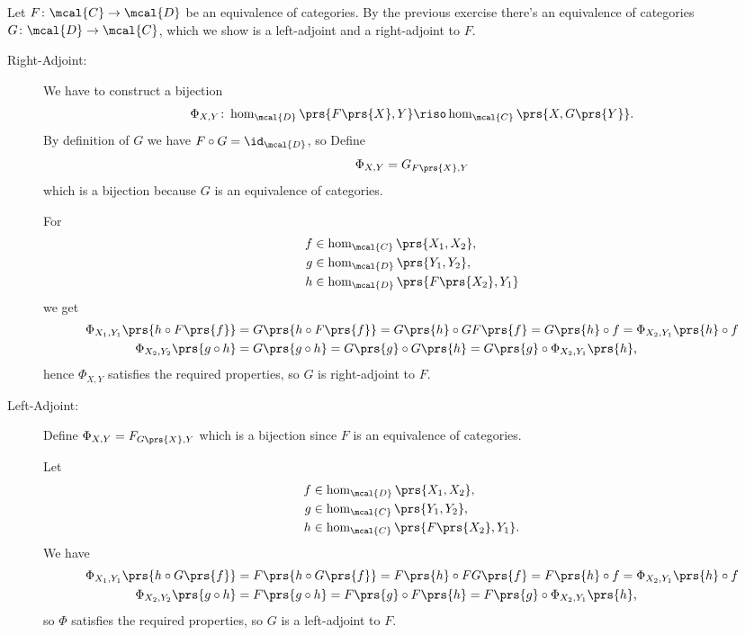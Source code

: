 \documentclass[10pt]{article}
\begin{document}
\begin{solution}%
Let $F \colon \mcal{C} \to \mcal{D}$ be an equivalence of categories. By the previous exercise there's an equivalence of categories $G \colon \mcal{D} \to \mcal{C}$, which we show is a left-adjoint and a right-adjoint to $F$.

\begin{description}
\item[Right-Adjoint:]
We have to construct a bijection 
\[\Phi_{X,Y} \colon \hom_{\mcal{D}}\prs{F\prs{X}, Y} \riso \hom_{\mcal{C}}\prs{X, G\prs{Y}} \text{.}\]
By definition of $G$ we have $F \circ G = \id_{\mcal{D}}$, so
Define
\[\Phi_{X,Y} = G_{F\prs{X}, Y}\]
which is a bijection because $G$ is an equivalence of categories.

For
\begin{align*}
f &\in \hom_{\mcal{C}}\prs{X_1, X_2},\\
g &\in \hom_{\mcal{D}}\prs{Y_1, Y_2},\\
h &\in \hom_{\mcal{D}}\prs{F\prs{X_2}, Y_1}
\end{align*}
we get
\begin{align*}
\Phi_{X_1, Y_1}\prs{h \circ F\prs{f}} &= G\prs{h \circ F\prs{f}} = G\prs{h} \circ GF\prs{f} = G\prs{h} \circ f = \Phi_{X_2, Y_1}\prs{h} \circ f \\
\Phi_{X_2, Y_2}\prs{g \circ h} &= G\prs{g \circ h} = G\prs{g} \circ G\prs{h} = G\prs{g} \circ \Phi_{X_2, Y_1}\prs{h} \text{,}
\end{align*}
hence $\Phi_{X,Y}$ satisfies the required properties, so $G$ is right-adjoint to $F$.

\item[Left-Adjoint:]
Define $\Phi_{X,Y} = F_{G\prs{X}, Y}$ which is a bijection since $F$ is an equivalence of categories.

Let
\begin{align*}
f &\in \hom_{\mcal{D}}\prs{X_1, X_2},\\
g &\in \hom_{\mcal{C}}\prs{Y_1, Y_2},\\
h &\in \hom_{\mcal{C}}\prs{F\prs{X_2}, Y_1} \text{.}
\end{align*}
We have
\begin{align*}
\Phi_{X_1, Y_1}\prs{h \circ G\prs{f}} &= F\prs{h \circ G\prs{f}} = F\prs{h} \circ FG\prs{f} = F\prs{h} \circ f = \Phi_{X_2, Y_1}\prs{h} \circ f  \\
\Phi_{X_2, Y_2}\prs{g \circ h} &= F\prs{g \circ h} = F\prs{g} \circ F\prs{h} = F\prs{g} \circ \Phi_{X_2, Y_1}\prs{h} \text{,}
\end{align*}
so $\Phi$ satisfies the required properties, so $G$ is a left-adjoint to $F$.
\end{description}
\end{solution}
\end{document}
